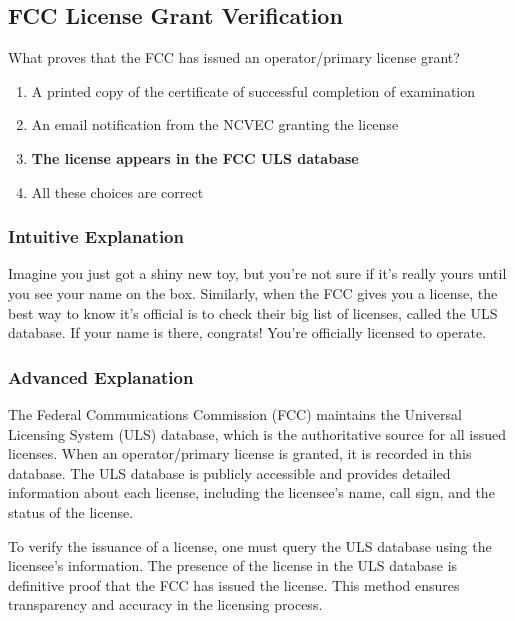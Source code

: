 \subsection{FCC License Grant Verification}
\label{T1A05}

\begin{tcolorbox}[colback=gray!10!white,colframe=black!75!black,title=T1A05]
What proves that the FCC has issued an operator/primary license grant?
\begin{enumerate}[label=\Alph*)]
    \item A printed copy of the certificate of successful completion of examination
    \item An email notification from the NCVEC granting the license
    \item \textbf{The license appears in the FCC ULS database}
    \item All these choices are correct
\end{enumerate}
\end{tcolorbox}

\subsubsection{Intuitive Explanation}
Imagine you just got a shiny new toy, but you’re not sure if it’s really yours until you see your name on the box. Similarly, when the FCC gives you a license, the best way to know it’s official is to check their big list of licenses, called the ULS database. If your name is there, congrats! You’re officially licensed to operate.

\subsubsection{Advanced Explanation}
The Federal Communications Commission (FCC) maintains the Universal Licensing System (ULS) database, which is the authoritative source for all issued licenses. When an operator/primary license is granted, it is recorded in this database. The ULS database is publicly accessible and provides detailed information about each license, including the licensee’s name, call sign, and the status of the license. 

To verify the issuance of a license, one must query the ULS database using the licensee’s information. The presence of the license in the ULS database is definitive proof that the FCC has issued the license. This method ensures transparency and accuracy in the licensing process.


